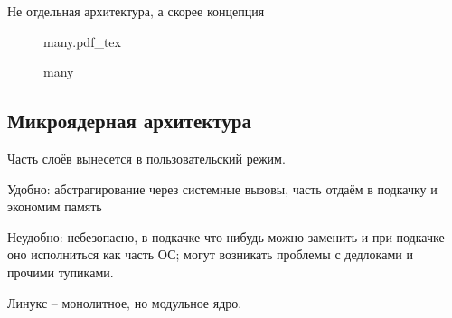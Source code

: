 \documentclass{book}
\theoremstyle{definition}
\newcommand{\incfig}[1]{%
    \def\svgwidth{\columnwidth}
    {#1.pdf_tex}
}
\begin{document}
    Не отдельная архитектура, а скорее концепция

\begin{figure}[!ht]
    \centering
    \incfig{many}
    \caption{many}
    \label{fig:many}
\end{figure}

\subsection{Микроядерная архитектура}

Часть слоёв вынесется в пользовательский режим.

Удобно: абстрагирование через системные вызовы, часть отдаём в подкачку и экономим память

Неудобно: небезопасно, в подкачке что-нибудь можно заменить и при подкачке оно исполниться как часть ОС; могут возникать проблемы с дедлоками и прочими тупиками.

Линукс -- монолитное, но модульное ядро. 
\end{document}
